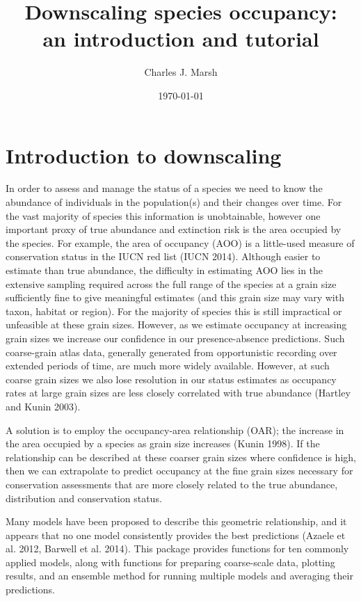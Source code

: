 \documentclass{article}[12pt, a4paper]
\begin{document}



\title{Downscaling species occupancy: \\ an introduction and tutorial}
\author{Charles J. Marsh}
\date{\today}
\maketitle
\tableofcontents

\newpage
\section{Introduction to downscaling}

In order to assess and manage the status of a species we need to know the abundance of individuals in the population(s) and their changes over time. For the vast majority of species this information is unobtainable, however one important proxy of true abundance and extinction risk is the area occupied by the species. For example, the area of occupancy (AOO) is a little-used measure of conservation status in the IUCN red list (IUCN 2014). Although easier to estimate than true abundance, the difficulty in estimating AOO lies in the extensive sampling required across the full range of the species at a grain size sufficiently fine to give meaningful estimates (and this grain size may vary with taxon, habitat or region). For the majority of species this is still impractical or unfeasible at these grain sizes. However, as we estimate occupancy at increasing grain sizes we increase our confidence in our presence-absence predictions. Such coarse-grain atlas data, generally generated from opportunistic recording over extended periods of time, are much more widely available. However, at such coarse grain sizes we also lose resolution in our status estimates as occupancy rates at large grain sizes are less closely correlated with true abundance (Hartley and Kunin 2003).

A solution is to employ the occupancy-area relationship (OAR); the increase in the  area occupied by a species as grain size increases (Kunin 1998). If the relationship can be described at these coarser grain sizes where confidence is high, then we can extrapolate to predict occupancy at the fine grain sizes necessary for conservation assessments that are more closely related to the true abundance, distribution and conservation status.

Many models have been proposed to describe this geometric relationship, and it appears that no one model consistently provides the best predictions (Azaele et al. 2012, Barwell et al. 2014). This package provides functions for ten commonly applied models, along with functions for preparing coarse-scale data, plotting results, and an ensemble method for running multiple models and averaging their predictions.
\end{document}
